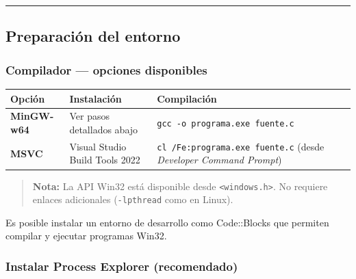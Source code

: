 \documentclass[
  spanish,
]{article}
\newcounter{none} %
\begin{document}
\begin{center}\rule{0.5\linewidth}{0.5pt}\end{center}

\subsection{Preparación del entorno}\label{preparaciuxf3n-del-entorno}

\subsubsection{Compilador --- opciones
disponibles}\label{compilador-opciones-disponibles}

{\def\LTcaptype{none} %
\begin{longtable}[]{@{}
  >{\raggedright\arraybackslash}p{}
  >{\raggedright\arraybackslash}p{}
  >{\raggedright\arraybackslash}p{}@{}}
\toprule\noalign{}
\begin{minipage}[b]{\linewidth}\raggedright
Opción
\end{minipage} & \begin{minipage}[b]{\linewidth}\raggedright
Instalación
\end{minipage} & \begin{minipage}[b]{\linewidth}\raggedright
Compilación
\end{minipage} \\
\midrule\noalign{}
\endhead
\bottomrule\noalign{}
\endlastfoot
\textbf{MinGW-w64} & Ver pasos detallados abajo &
\texttt{gcc\ -o\ programa.exe\ fuente.c} \\
\textbf{MSVC} & Visual Studio Build Tools 2022 &
\texttt{cl\ /Fe:programa.exe\ fuente.c} (desde \emph{Developer Command
Prompt}) \\
\end{longtable}
}

\begin{quote}
\textbf{Nota:} La API Win32 está disponible desde
\texttt{\textless{}windows.h\textgreater{}}. No requiere enlaces
adicionales (\texttt{-lpthread} como en Linux).
\end{quote}

Es posible instalar un entorno de desarrollo como Code::Blocks que
permiten compilar y ejecutar programas Win32.

\subsubsection{Instalar Process Explorer
(recomendado)}\label{instalar-process-explorer-recomendado}
\end{document}
